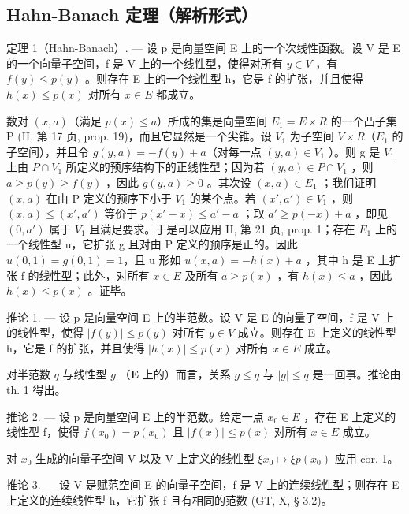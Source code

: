 \subsection{Hahn-Banach 定理（解析形式）}

定理 1（Hahn-Banach）. --- 设 p 是向量空间 E 上的一个次线性函数。设 V 是 E 的一个向量子空间，f 是 V 上的一个线性型，使得对所有 \(y \in V\) ，有 \(f(y) \leqslant p(y)\) 。则存在 E 上的一个线性型 h，它是 f 的扩张，并且使得 \(h(x) \leqslant p(x)\) 对所有 \(x \in E\) 都成立。

数对 \((x, a)\)（满足 \(p(x) \leqslant a\)）所成的集是向量空间 \(E_{1} = E \times R\) 的一个凸子集 P (II, 第 17 页, prop. 19)，而且它显然是一个尖锥。设 \(V_{1}\) 为子空间 \(V \times R\)（\(E_{1}\) 的子空间），并且令 \(g(y, a) = -f(y) + a\)（对每一点 \((y, a) \in V_{1}\) ）。则 g 是 \(V_{1}\) 上由 \(P \cap V_{1}\) 所定义的预序结构下的正线性型；因为若 \((y, a) \in P \cap V_{1}\) ，则 \(a \geqslant p(y) \geqslant f(y)\) ，因此 \(g(y, a) \geqslant 0\) 。其次设 \((x, a) \in E_{1}\) ；我们证明 \((x, a)\) 在由 P 定义的预序下小于 \(V_{1}\) 的某个点。若 \((x', a') \in V_{1}\) ，则 \((x, a) \leqslant (x', a')\) 等价于 \(p(x' - x) \leqslant a' - a\) ；取 \(a' \geqslant p(-x) + a\) ，即见 \((0, a')\) 属于 \(V_{1}\) 且满足要求。于是可以应用 II, 第 21 页, prop. 1；存在 \(E_{1}\) 上的一个线性型 u，它扩张 g 且对由 P 定义的预序是正的。因此 \(u(0, 1) = g(0, 1) = 1\)，且 u 形如 \(u(x, a) = -h(x) + a\) ，其中 h 是 E 上扩张 f 的线性型；此外，对所有 \(x \in E\) 及所有 \(a \geqslant p(x)\) ，有 \(h(x) \leqslant a\) ，因此 \(h(x) \leqslant p(x)\) 。证毕。

推论 1. --- 设 p 是向量空间 E 上的半范数。设 V 是 E 的向量子空间，f 是 V 上的线性型，使得 \(|f(y)| \leqslant p(y)\) 对所有 \(y \in V\) 成立。则存在 E 上定义的线性型 h，它是 f 的扩张，并且使得 \(|h(x)| \leqslant p(x)\) 对所有 \(x \in E\) 成立。

对半范数 \(q\) 与线性型 \(g\) （\(\mathbf{E}\) 上的）而言，关系 \(g \leqslant q\) 与 \(|g| \leqslant q\) 是一回事。推论由 th. 1 得出。

推论 2. --- 设 p 是向量空间 E 上的半范数。给定一点 \(x_{0} \in E\) ，存在 E 上定义的线性型 f，使得 \(f(x_{0}) = p(x_{0})\) 且 \(|f(x)| \leqslant p(x)\) 对所有 \(x \in E\) 成立。

对 \(x_0\) 生成的向量子空间 V 以及 V 上定义的线性型 \(\xi x_0 \mapsto \xi p(x_0)\) 应用 cor. 1。

推论 3. --- 设 V 是赋范空间 E 的向量子空间，f 是 V 上的连续线性型；则存在 E 上定义的连续线性型 h，它扩张 f 且有相同的范数 (GT, X, § 3.2)。

